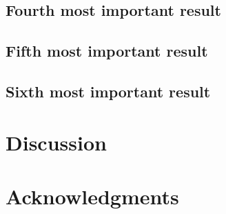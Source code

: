 \documentclass[11pt,letterpaper]{article}
\begin{document}
\subsection*{Fourth most important result}
\label{sec:org34b804a}



\subsection*{Fifth most important result}
\label{sec:orgba67222}



\subsection*{Sixth most important result}
\label{sec:org78b9529}


\section*{Discussion}
\label{sec:org3169457}


\section*{Acknowledgments}
\label{sec:orgd08987f}
\end{document}
